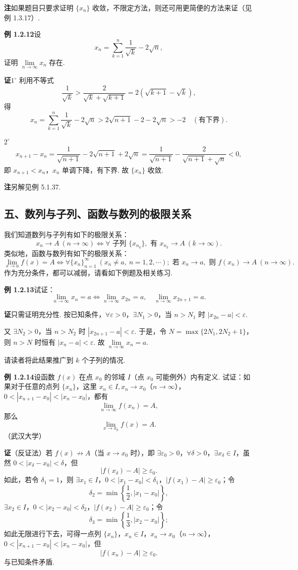 \documentclass[UTF8,12pt,a4paper,fontset=fandol]{ctexart}
\begin{document}
\noindent\textbf{注}\quad 如果题目只要求证明 $\{x_n\}$ 收敛，不限定方法，则还可用更简便的方法来证（见例 1.3.17）.

\noindent\textbf{例 1.2.12}\quad 设
\[
  x_n=\sum_{k=1}^n\frac1{\sqrt k}-2\sqrt n,
\]
证明 $\lim\limits_{n\to\infty}x_n$ 存在.

\noindent\textbf{证}\quad $1^\circ$ 利用不等式
\[
  \frac1{\sqrt k}>\frac2{\sqrt k+\sqrt{k+1}}=2(\sqrt{k+1}-\sqrt k),
\]
得
\[
  x_n=\sum_{k=1}^n\frac1{\sqrt k}-2\sqrt n
  >2\sqrt{n+1}-2-2\sqrt n>-2\quad(\text{有下界}).
\]

$2^\circ$
\[
  x_{n+1}-x_n=\frac1{\sqrt{n+1}}-2\sqrt{n+1}+2\sqrt n
  =\frac1{\sqrt{n+1}}-\frac2{\sqrt{n+1}+\sqrt n}<0,
\]
即 $x_{n+1}<x_n$，$x_n$ 单调下降，有下界. 故 $\{x_n\}$ 收敛.

\noindent\textbf{注}\quad 另解见例 5.1.37.

\subsection*{五、数列与子列、函数与数列的极限关系}

我们知道数列与子列有如下的极限关系：
\[
  x_n\to A\ (n\to\infty)\Leftrightarrow \forall\text{ 子列 }\{x_{n_k}\},\text{ 有 }x_{n_k}\to A\ (k\to\infty).
\]
类似地，函数与数列有如下的极限关系：
\[
  \lim_{x\to a}f(x)=A\Leftrightarrow
  \forall \{x_n\}_{n=1}^{\infty}\ (x_n\ne a,\ n=1,2,\cdots);\text{ 若 }x_n\to a,\text{ 则 }f(x_n)\to A\ (n\to\infty).
\]
作为充分条件，都可以减弱，请看如下例题及相关练习.

\noindent\textbf{例 1.2.13}\quad 试证：
\[
  \lim_{n\to\infty}x_n=a\Leftrightarrow
  \lim_{n\to\infty}x_{2n}=a,\quad
  \lim_{n\to\infty}x_{2n+1}=a.
\]

\noindent\textbf{证}\quad 只需证明充分性. 按已知条件，$\forall\varepsilon>0$，$\exists N_1>0$，当 $n>N_1$ 时 $|x_{2n}-a|<\varepsilon$.

又 $\exists N_2>0$，当 $n>N_2$ 时 $|x_{2n+1}-a|<\varepsilon$. 于是，令 $N=\max\{2N_1,2N_2+1\}$，则 $n>N$ 时恒有 $|x_n-a|<\varepsilon$. 故 $\lim\limits_{n\to\infty}x_n=a$.

请读者将此结果推广到 $k$ 个子列的情况.

\noindent\textbf{例 1.2.14}\quad 设函数 $f(x)$ 在点 $x_0$ 的邻域 $I$（点 $x_0$ 可能例外）内有定义. 试证：如果对于任意的点列 $\{x_n\}$，这里 $x_n\in I,x_n\to x_0$（$n\to\infty$），$0<|x_{n+1}-x_0|<|x_n-x_0|$，都有
\[
  \lim_{n\to\infty}f(x_n)=A,
\]
那么
\[
  \lim_{x\to x_0}f(x)=A.
\]
（武汉大学）

\noindent\textbf{证}\quad （反证法）若 $f(x)\not\to A$（当 $x\to x_0$ 时），即 $\exists\varepsilon_0>0$，$\forall\delta>0$，$\exists x_\delta\in I$，虽然 $0<|x_\delta-x_0|<\delta$，但
\[
  |f(x_\delta)-A|\ge\varepsilon_0.
\]
如此，若令 $\delta_1=1$，则 $\exists x_1\in I$，$0<|x_1-x_0|<\delta_1$，$|f(x_1)-A|\ge\varepsilon_0$；令
\[
  \delta_2=\min\left\{\frac12,|x_1-x_0|\right\},
\]
$\exists x_2\in I$，$0<|x_2-x_0|<\delta_2$，$|f(x_2)-A|\ge\varepsilon_0$；令
\[
  \delta_3=\min\left\{\frac13,|x_2-x_0|\right\};
\]
如此无限进行下去，可得一点列 $\{x_n\}$，$x_n\in I$，$x_n\to x_0$（$n\to\infty$），$0<|x_{n+1}-x_0|<|x_n-x_0|$，但
\[
  |f(x_n)-A|\ge\varepsilon_0.
\]
与已知条件矛盾.
\end{document}
